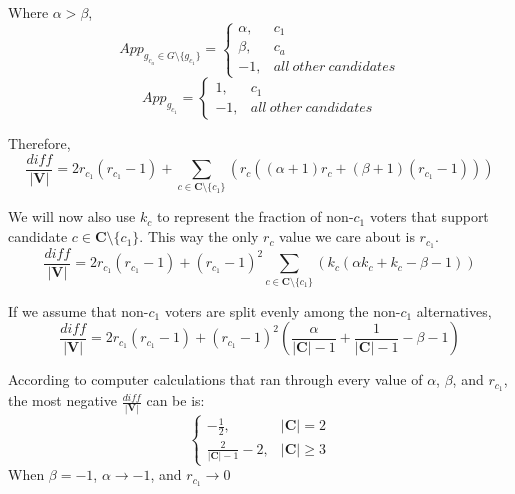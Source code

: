 \documentclass{article}
\begin{document}
Where $\alpha > \beta$,
\begin{equation}
App_{g_{c_a} \in G \setminus \{g_{c_1}\}} = 
    \begin{cases}
    \alpha, & c_1\\
    \beta, & c_a\\
    -1, & all\ other\ candidates
    \end{cases}
\end{equation}
\begin{equation}
App_{g_{c_1}} = 
    \begin{cases}
    1, & c_1\\
    -1, & all\ other\ candidates
    \end{cases}
\end{equation}

Therefore,
\begin{equation}
\frac{diff}{|\boldsymbol{V}|} = 2r_{c_1}(r_{c_1} - 1) + \sum^{}_{c \in \boldsymbol{C} \setminus \{c_1\}}{\left( r_c \left( (\alpha + 1)r_c + (\beta + 1)(r_{c_1} - 1) \right) \right)}
\end{equation}

We will now also use $k_c$ to represent the fraction of non-$c_1$ voters that support candidate $c \in \boldsymbol{C} \setminus \{c_1\}$. This way the only $r_c$ value we care about is $r_{c_1}$.
\begin{equation}
\frac{diff}{|\boldsymbol{V}|} = 2r_{c_1}(r_{c_1} - 1) + (r_{c_1} - 1)^2\sum^{}_{c \in \boldsymbol{C} \setminus \{c_1\}}{\left( k_c \left( \alpha k_c + k_c - \beta - 1 \right) \right)}
\end{equation}

If we assume that non-$c_1$ voters are split evenly among the non-$c_1$ alternatives,
\begin{equation}
\frac{diff}{|\boldsymbol{V}|} = 2r_{c_1}(r_{c_1} - 1) + (r_{c_1} - 1)^2\left(\frac{\alpha}{|\boldsymbol{C}|-1} + \frac{1}{|\boldsymbol{C}|-1} - \beta - 1 \right)
\end{equation}

According to computer calculations that ran through every value of $\alpha$, $\beta$, and $r_{c_1}$, the most negative $\frac{diff}{|\boldsymbol{V}|}$ can be is:
\begin{equation}
\begin{cases}
    -\frac{1}{2}, & |\boldsymbol{C}| = 2\\
    \frac{2}{|\boldsymbol{C}|-1} - 2, & |\boldsymbol{C}| \geq 3
\end{cases}
\end{equation}
When $\beta = -1$, $\alpha \to -1$, and $r_{c_1} \to 0$
\end{document}
